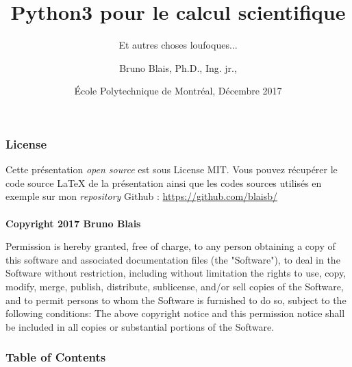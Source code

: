 \documentclass[]{beamer}
\begin{document}
 


\title[Python3 pour le calcul scientifique] %
{Python3 pour le calcul scientifique}
 
\subtitle{Et autres choses loufoques...}
 
\author[Bruno, Blais] %
{Bruno Blais, Ph.D., Ing. jr.,}
 
 
\date[EPM 2017] %
{École Polytechnique de Montréal, Décembre 2017}
 
\frame{\titlepage} 
 
\begin{frame}
\frametitle{License}
Cette présentation \textit{open source} est sous License MIT. Vous pouvez récupérer le code source LaTeX de la présentation ainsi que les codes sources utilisés en exemple sur mon \textit{repository} Github : \url{https://github.com/blaisb/} \\
~\\
\textbf{ Copyright 2017 Bruno Blais}

\footnotesize{Permission is hereby granted, free of charge, to any person obtaining a copy of this software and associated documentation files (the "Software"), to deal in the Software without restriction, including without limitation the rights to use, copy, modify, merge, publish, distribute, sublicense, and/or sell copies of the Software, and to permit persons to whom the Software is furnished to do so, subject to the following conditions:
The above copyright notice and this permission notice shall be included in all copies or substantial portions of the Software.}
\end{frame}

\begin{frame}
\frametitle{Table of Contents}
\tableofcontents
\end{frame}
\end{document}
